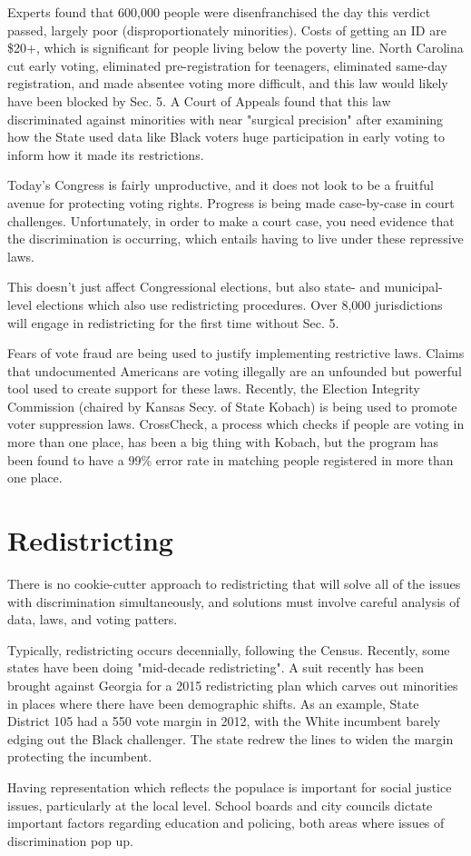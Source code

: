 Experts found that 600,000 people were disenfranchised the day this verdict passed, largely poor (disproportionately minorities).  Costs of getting an ID are \$20+, which is significant for people living below the poverty line.  North Carolina cut early voting, eliminated pre-registration for teenagers, eliminated same-day registration, and made absentee voting more difficult, and this law would likely have been blocked by Sec. 5.  A Court of Appeals found that this law discriminated against minorities with near "surgical precision" after examining how the State used data like Black voters huge participation in early voting to inform how it made its restrictions.

Today's Congress is fairly unproductive, and it does not look to be a fruitful avenue for protecting voting rights.  Progress is being made case-by-case in court challenges.  Unfortunately, in order to make a court case, you need evidence that the discrimination is occurring, which entails having to live under these repressive laws.

This doesn't just affect Congressional elections, but also state- and municipal-level elections which also use redistricting procedures.  Over 8,000 jurisdictions will engage in redistricting for the first time without Sec. 5.

Fears of vote fraud are being used to justify implementing restrictive laws.  Claims that undocumented Americans are voting illegally are an unfounded but powerful tool used to create support for these laws.  Recently, the Election Integrity Commission (chaired by Kansas Secy. of State Kobach) is being used to promote voter suppression laws.  CrossCheck, a process which checks if people are voting in more than one place, has been a big thing with Kobach, but the program has been found to have a 99\% error rate in matching people registered in more than one place.


\section*{Redistricting}

There is no cookie-cutter approach to redistricting that will solve all of the issues with discrimination simultaneously, and solutions must involve careful analysis of data, laws, and voting patters.

Typically, redistricting occurs decennially, following the Census.  Recently, some states have been doing "mid-decade redistricting".  A suit recently has been brought against Georgia for a 2015 redistricting plan which carves out minorities in places where there have been demographic shifts.  As an example, State District 105 had a 550 vote margin in 2012, with the White incumbent barely edging out the Black challenger.  The state redrew the lines to widen the margin protecting the incumbent.  

Having representation which reflects the populace is important for social justice issues, particularly at the local level.  School boards and city councils dictate important factors regarding education and policing, both areas where issues of discrimination pop up.
